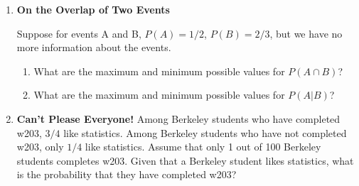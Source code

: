 \documentclass[12pt,a4paper]{article}
\numberwithin{equation}{subsection}
\begin{document}
\begin{enumerate}
 
\item \textbf{On the Overlap of Two Events}

Suppose for events A and B, $P(A) = 1/2$, $P(B) = 2/3$, but we have no more information about the events.
 \begin{enumerate}
\item What are the maximum and minimum possible values for $P(A \cap B)$?
\item What are the maximum and minimum possible values for $P(A|B)$?
\end{enumerate}


\item \textbf{Can't Please Everyone!}
Among Berkeley students who have completed w203, $3/4$ like statistics.  Among Berkeley students who have not completed w203, only $1/4$ like statistics.  Assume that only 1 out of 100 Berkeley students completes w203.  Given that a Berkeley student likes statistics, what is the probability that they have completed w203?


\end{enumerate}
\end{document}
